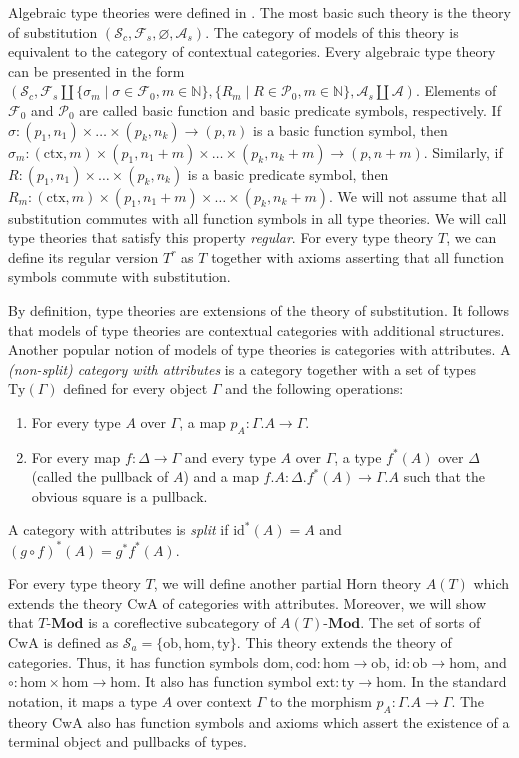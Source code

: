 \documentclass[reqno]{amsart}
\theoremstyle{definition}
\theoremstyle{remark}
\newcommand{\fs}[1]{\mathrm{#1}}
\newcommand{\Mod}[1]{#1\text{-}\mathbf{Mod}}
\numberwithin{figure}{section}
\begin{document}
Algebraic type theories were defined in \cite{alg-tt}.
The most basic such theory is the theory of substitution $(\mathcal{S}_c, \mathcal{F}_s, \varnothing, \mathcal{A}_s)$.
The category of models of this theory is equivalent to the category of contextual categories.
Every algebraic type theory can be presented in the form $(\mathcal{S}_c, \mathcal{F}_s \amalg \{ \sigma_m \mid \sigma \in \mathcal{F}_0, m \in \mathbb{N} \}, \{ R_m \mid R \in \mathcal{P}_0, m \in \mathbb{N} \}, \mathcal{A}_s \amalg \mathcal{A})$.
Elements of $\mathcal{F}_0$ and $\mathcal{P}_0$ are called basic function and basic predicate symbols, respectively.
If $\sigma : (p_1,n_1) \times \ldots \times (p_k,n_k) \to (p,n)$ is a basic function symbol, then $\sigma_m : (\fs{ctx},m) \times (p_1,n_1+m) \times \ldots \times (p_k,n_k+m) \to (p,n+m)$.
Similarly, if $R : (p_1,n_1) \times \ldots \times (p_k,n_k)$ is a basic predicate symbol, then $R_m : (\fs{ctx},m) \times (p_1,n_1+m) \times \ldots \times (p_k,n_k+m)$.
We will not assume that all substitution commutes with all function symbols in all type theories.
We will call type theories that satisfy this property \emph{regular}.
For every type theory $T$, we can define its regular version $T^r$ as $T$ together with axioms asserting that all function symbols commute with substitution.

By definition, type theories are extensions of the theory of substitution.
It follows that models of type theories are contextual categories with additional structures.
Another popular notion of models of type theories is categories with attributes.
A \emph{(non-split) category with attributes} is a category together with a set of types $\fs{Ty}(\Gamma)$ defined for every object $\Gamma$ and the following operations:
\begin{enumerate}
\item For every type $A$ over $\Gamma$, a map $p_A : \Gamma.A \to \Gamma$.
\item For every map $f : \Delta \to \Gamma$ and every type $A$ over $\Gamma$, a type $f^*(A)$ over $\Delta$ (called the pullback of $A$) and a map $f.A : \Delta.f^*(A) \to \Gamma.A$ such that the obvious square is a pullback.
\end{enumerate}
A category with attributes is \emph{split} if $\fs{id}^*(A) = A$ and $(g \circ f)^*(A) = g^*f^*(A)$.

For every type theory $T$, we will define another partial Horn theory $A(T)$ which extends the theory $\fs{CwA}$ of categories with attributes.
Moreover, we will show that $\Mod{T}$ is a coreflective subcategory of $\Mod{A(T)}$.
The set of sorts of $\fs{CwA}$ is defined as $\mathcal{S}_a = \{ \fs{ob}, \fs{hom}, \fs{ty} \}$.
This theory extends the theory of categories.
Thus, it has function symbols $\fs{dom},\fs{cod} : \fs{hom} \to \fs{ob}$, $\fs{id} : \fs{ob} \to \fs{hom}$, and $\circ : \fs{hom} \times \fs{hom} \to \fs{hom}$.
It also has function symbol $\fs{ext} : \fs{ty} \to \fs{hom}$.
In the standard notation, it maps a type $A$ over context $\Gamma$ to the morphism $p_A : \Gamma.A \to \Gamma$.
The theory $\fs{CwA}$ also has function symbols and axioms which assert the existence of a terminal object and pullbacks of types.
\end{document}

